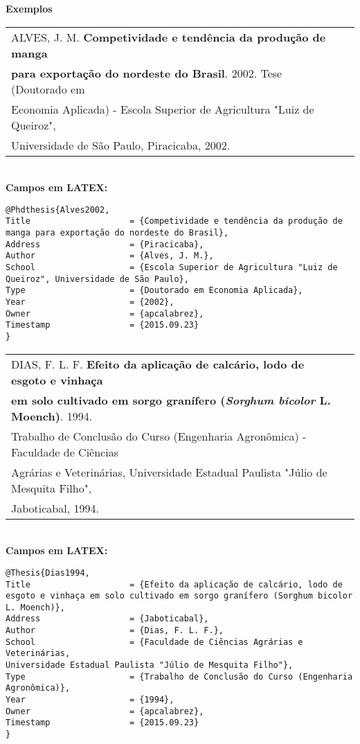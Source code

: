 \textbf{Exemplos}\\

\begin{tabular}{|l|c|} \hline
	ALVES, J. M. \textbf{Competividade e tendência da produção de manga} \\ \textbf{para exportação do nordeste do Brasil}. 2002. Tese (Doutorado em \\ Economia Aplicada) - Escola Superior de Agricultura "Luiz de Queiroz", \\ Universidade de São Paulo, Piracicaba, 2002.    \\\hline
\end{tabular} \\

\textbf{Campos em LATEX:}

\begin{verbatim}
@Phdthesis{Alves2002,
Title                    = {Competividade e tendência da produção de 
manga para exportação do nordeste do Brasil},
Address                  = {Piracicaba},
Author                   = {Alves, J. M.},
School                   = {Escola Superior de Agricultura "Luiz de 
Queiroz", Universidade de São Paulo},
Type                     = {Doutorado em Economia Aplicada},
Year                     = {2002},
Owner                    = {apcalabrez},
Timestamp                = {2015.09.23}
}
\end{verbatim} 

\begin{tabular}{|l|c|} \hline
	DIAS, F. L. F. \textbf{Efeito da aplicação de calcário, lodo de esgoto e vinhaça} \\ \textbf{em solo cultivado em sorgo granífero (\textit{Sorghum bicolor} L. Moench)}. 1994. \\ Trabalho de Conclusão do Curso (Engenharia Agronômica) - Faculdade de Ciências\\  Agrárias e Veterinárias, Universidade Estadual Paulista "Júlio de Mesquita Filho", \\ Jaboticabal, 1994.     \\\hline
\end{tabular} \\

\textbf{Campos em LATEX:} 

\begin{verbatim}
@Thesis{Dias1994,
Title                    = {Efeito da aplicação de calcário, lodo de 
esgoto e vinhaça em solo cultivado em sorgo granífero (Sorghum bicolor 
L. Moench)},
Address                  = {Jaboticabal},
Author                   = {Dias, F. L. F.},
School                   = {Faculdade de Ciências Agrárias e Veterinárias, 
Universidade Estadual Paulista "Júlio de Mesquita Filho"},
Type                     = {Trabalho de Conclusão do Curso (Engenharia 
Agronômica)},
Year                     = {1994},
Owner                    = {apcalabrez},
Timestamp                = {2015.09.23}
}
\end{verbatim}


